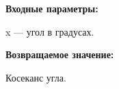 \textbf{Входные параметры:}

 x --- угол в градусах.

\textbf{Возвращаемое значение:}

Косеканс угла.